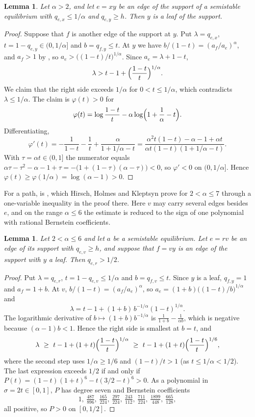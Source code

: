 \documentclass[11pt]{article}
\newtheorem{lemma}[theorem]{Lemma}
\theoremstyle{definition}
\theoremstyle{remark}
\begin{document}
\begin{lemma}\label{lem:depth}
Let $\alpha>2$, and let $e=xy$ be an edge of the support of a semistable equilibrium with $q_{e,x}\le 1/\alpha$ and $q_{e,y}\ge h$. Then $y$ is a leaf of the support.
\end{lemma}

\begin{proof}
Suppose that $f$ is another edge of the support at $y$. Put $\lambda=q_{e,x}$, $t=1-q_{e,y}\in(0,1/\alpha]$ and $b=q_{f,y}\le t$.
At $y$ we have $b/(1-t)=(a_f/a_e)^\alpha$, and $a_f>1$ by , so
$a_e>\bigl((1-t)/t\bigr)^{1/\alpha}$. Since $a_e=\lambda+1-t$,
\[
  \lambda>t-1+\Bigl(\frac{1-t}{t}\Bigr)^{1/\alpha}.
\]
We claim that the right side exceeds $1/\alpha$ for $0<t\le 1/\alpha$, which contradicts $\lambda\le 1/\alpha$. The
claim is $\varphi(t)>0$ for
\[
  \varphi(t)=\log\frac{1-t}{t}-\alpha\log\Bigl(1+\frac1\alpha-t\Bigr).
\]
Differentiating,
\[
  \varphi'(t)=-\frac1{1-t}-\frac1t+\frac{\alpha}{1+1/\alpha-t}
  =\frac{\alpha^2t(1-t)-\alpha-1+\alpha t}{\alpha t(1-t)(1+1/\alpha-t)} .
\]
With $\tau=\alpha t\in(0,1]$ the numerator equals $\alpha\tau-\tau^2-\alpha-1+\tau=-\bigl(1+(1-\tau)(\alpha-\tau)\bigr)<0$, so
$\varphi'<0$ on $(0,1/\alpha]$.
Hence $\varphi(t)\ge\varphi(1/\alpha)=\log(\alpha-1)>0$.
\end{proof}

For a path,  is \cite[Lemma~4]{HHK}, which Hirsch, Holmes and Kleptsyn prove for
$2<\alpha\le 7$ through a one-variable inequality in the proof there. Here $v$ may carry several edges besides $e$, and on the
range $\alpha\le 6$ the estimate is reduced to the sign of one polynomial with rational Bernstein coefficients.

\begin{lemma}\label{lem:branch}
Let $2<\alpha\le 6$ and let $a$ be a semistable equilibrium. Let $e=rv$ be an edge of its support with $q_{e,v}\ge h$, and suppose that $f=vy$ is an edge of the support
with $y$ a leaf. Then $q_{e,r}>1/2$.
\end{lemma}

\begin{proof}
Put $\lambda=q_{e,r}$, $t=1-q_{e,v}\le 1/\alpha$ and $b=q_{f,v}\le t$. Since $y$ is a leaf, $q_{f,y}=1$ and
$a_f=1+b$. At $v$, $b/(1-t)=(a_f/a_e)^\alpha$, so $a_e=(1+b)\bigl((1-t)/b\bigr)^{1/\alpha}$ and
\[
  \lambda=t-1+(1+b)\,b^{-1/\alpha}(1-t)^{1/\alpha}.
\]
The logarithmic derivative of $b\mapsto(1+b)b^{-1/\alpha}$ is $\frac1{1+b}-\frac1{\alpha b}$, which is negative
because $(\alpha-1)b<1$. Hence the right side is smallest at $b=t$, and
\[
  \lambda\ \ge\ t-1+(1+t)\Bigl(\frac{1-t}{t}\Bigr)^{1/\alpha}\ \ge\ t-1+(1+t)\Bigl(\frac{1-t}{t}\Bigr)^{1/6},
\]
where the second step uses $1/\alpha\ge 1/6$ and $(1-t)/t>1$ (as $t\le 1/\alpha<1/2$). The last expression exceeds
$1/2$ if and only if $P(t)=(1-t)(1+t)^6-t(3/2-t)^6>0$. As a polynomial in $\sigma=2t\in[0,1]$, $P$ has degree seven
and Bernstein coefficients
\[
  1,\ \tfrac{487}{896},\ \tfrac{165}{224},\ \tfrac{297}{224},\ \tfrac{243}{112},\ \tfrac{711}{224},\
  \tfrac{1899}{448},\ \tfrac{665}{128},
\]
all positive, so $P>0$ on $[0,1/2]$.
\end{proof}
\end{document}
